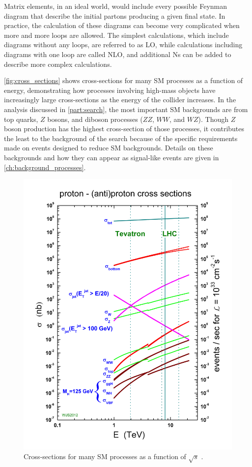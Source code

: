 Matrix elements, in an ideal world, would include every possible Feynman diagram that describe the initial partons producing a given final state. In practice, the calculation of these diagrams can become very complicated when more and more loops are allowed. The simplest calculations, which include diagrams without any loops, are referred to as \ac{LO}, while calculations including diagrams with one loop are called \ac{NLO}, and additional Ns can be added to describe more complex calculations.

\autoref{fig:cross_sections} shows cross-sections for many \ac{SM} processes as a function of energy, demonstrating how processes involving high-mass objects have increasingly large cross-sections as the energy of the collider increases. In the analysis discussed in \autoref{part:search}, the most important \ac{SM} backgrounds are from top quarks, $Z$ bosons, and diboson processes ($ZZ$, $WW$, and $WZ$). Though $Z$ boson production has the highest cross-section of those processes, it contributes the least to the background of the search because of the specific requirements made on events designed to reduce \ac{SM} backgrounds. Details on these backgrounds and how they can appear as signal-like events are given in \autoref{ch:background_processes}. 

\begin{centering}
\begin{figure}[!hbt]
\myfloatalign
\includegraphics[width=.60\linewidth]{figures/lhc/crosssections2013.jpg}
\caption{Cross-sections for many \ac{SM} processes as a function of $\sqrt{s}$ \cite{crosssections}.}
\label{fig:cross_sections}
\end{figure}
\end{centering}


